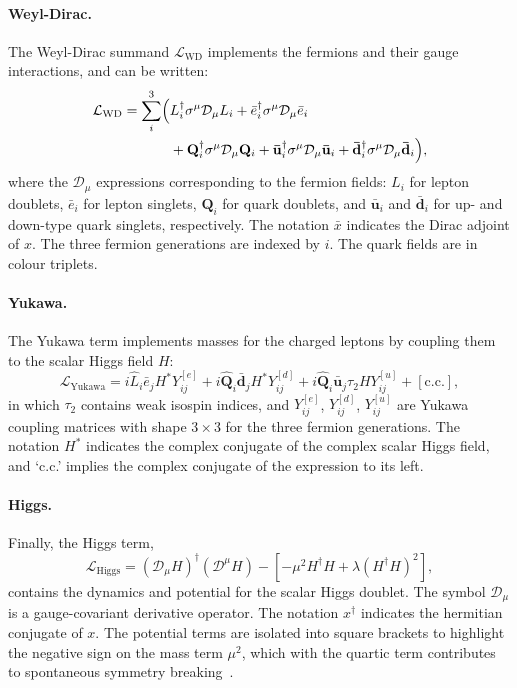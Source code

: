 \paragraph{Weyl-Dirac.}
The Weyl-Dirac summand $\mathcal{L}_\mathrm{WD}$ implements the fermions and
their gauge interactions, and can be written:
\begin{equation}
\begin{split}
\mathcal{L}_\mathrm{WD} =
\sum_i^3
\Bigl(
& L^\dagger_i \sigma^\mu \mathcal{D}_\mu L_i
+ \bar e^\dagger_i \sigma^\mu \mathcal{D}_\mu \bar e_i \\
& + \mathbf{Q}^\dagger_i \sigma^\mu \mathcal{D}_\mu \mathbf{Q}_i
+ \mathbf{\bar u}^\dagger_i \sigma^\mu \mathcal{D}_\mu \mathbf{\bar u}_i
+ \mathbf{\bar d}^\dagger_i \sigma^\mu \mathcal{D}_\mu \mathbf{\bar d}_i
\Bigr)
,
\end{split}
\end{equation}
where the $\mathcal{D}_\mu$ expressions corresponding to the fermion fields:
$L_i$ for lepton doublets,
$\bar e_i$ for lepton singlets,
$\mathbf{Q}_i$ for quark doublets,
and $\mathbf{\bar u}_i$ and $\mathbf{\bar d}_i$ for up- and down-type quark
singlets, respectively.
The notation $\bar x$ indicates the Dirac adjoint of $x$.
The three fermion generations are indexed by $i$.
The quark fields are in colour triplets.

\paragraph{Yukawa.}
The Yukawa term implements masses for the charged leptons by coupling
them to the scalar Higgs field $H$:
\begin{equation}
\mathcal{L}_\mathrm{Yukawa} =
i\hat L_i \bar e_j H^* Y^{[e]}_{ij}
+ i\mathbf{\widehat Q}_i \mathbf{\bar d}_j H^* Y^{[d]}_{ij}
+ i\mathbf{\widehat Q}_i \mathbf{\bar u}_j \tau_2 H Y^{[u]}_{ij}
+ [\textrm{c.c.}]
,
\end{equation}
in which $\tau_2$ contains weak isospin indices,
and $Y^{[e]}_{ij}$, $Y^{[d]}_{ij}$, $Y^{[u]}_{ij}$ are Yukawa coupling matrices
with shape $3\times3$ for the three fermion generations.
The notation $H^*$ indicates the complex conjugate of the complex scalar
Higgs field, and `c.c.' implies the complex conjugate of the expression to
its left.

\paragraph{Higgs.}
Finally, the Higgs term,
\begin{equation}
\mathcal{L}_\mathrm{Higgs} =
(\mathcal{D}_\mu H)^\dagger (\mathcal{D}^\mu H)
- \left[ -\mu^2 H^\dagger H + \lambda (H^\dagger H)^2 \right]
,
\end{equation}
contains the dynamics and potential for the scalar Higgs doublet.
The symbol $\mathcal{D}_\mu$ is a gauge-covariant derivative operator.
The notation $x^\dagger$ indicates the hermitian conjugate of $x$.
The potential terms are isolated into square brackets to highlight the negative
sign on the mass term $\mu^2$, which with the quartic term contributes to
spontaneous symmetry breaking~\cite{rubakov1999classical}.



